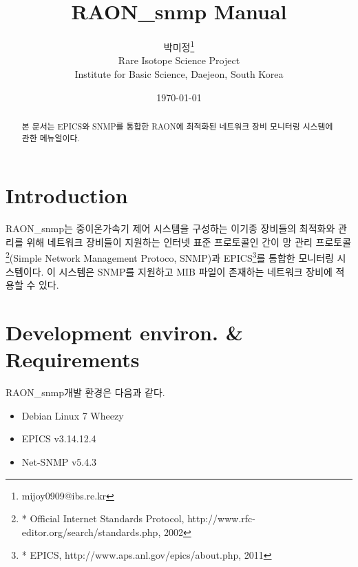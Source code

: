 \documentclass[11pt
  , a4paper
  , article
  , oneside
]{memoir}
\begin{document}
 
\newcommand{\technumber}{
  RAON Control-Document Series\\
  Revision : v0.1,   Release : August. 04. 2015}
\title{\textbf{RAON\_snmp Manual}}

\author{박미정\thanks{mijoy0909@ibs.re.kr} \\

  Rare Isotope Science Project\\
  Institute for Basic Science, Daejeon, South Korea
}
\date{\today}


\renewcommand{\maketitlehooka}{\begin{flushright}\textsf{\technumber}\end{flushright}}

\maketitle

\begin{abstract}
본 문서는 EPICS와 SNMP를 통합한 RAON에 최적화된 네트워크 장비 모니터링 시스템에 관한 메뉴얼이다.
\end{abstract}

\chapter{Introduction}
RAON\_snmp는 중이온가속기 제어 시스템을 구성하는 이기종 장비들의 최적화와 관리를 위해 네트워크 장비들이 지원하는 인터넷 표준 프로토콜인 간이 망 관리 프로토콜\footnote{* Official Internet Standards Protocol, http://www.rfc-editor.org/search/standards.php, 2002}(Simple Network Management Protoco, SNMP)과 EPICS\footnote{* EPICS, http://www.aps.anl.gov/epics/about.php, 2011}를 통합한 모니터링 시스템이다. 이 시스템은 SNMP를 지원하고 MIB 파일이 존재하는 네트워크 장비에 적용할 수 있다.

\chapter{Development environ. \& Requirements}

RAON\_snmp개발 환경은 다음과 같다.
\begin{itemize}
\item Debian Linux 7 Wheezy
\item EPICS v3.14.12.4
\item Net-SNMP v5.4.3
\end{itemize}
\end{document}
